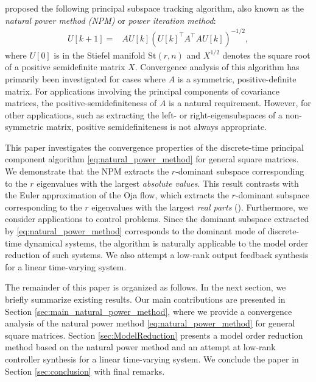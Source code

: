\documentclass{ifacconf}
\begin{document}
\cite{hua1999new} proposed the following principal subspace tracking algorithm, also known as the \textit{natural power method (NPM)} or \textit{power iteration method}:
\begin{align}
    U[k+1] =& A U[k] (U[k]^{\top} A^{\top} A U[k]) ^{-1/2}, 
    \label{eq:natural_power_method}
\end{align}
where $U[0]$ is in the Stiefel manifold $\mathrm{St}(r,n)$ and $X^{1/2}$ denotes the square root of a positive semidefinite matrix $X$. 
Convergence analysis of this algorithm has primarily been investigated for cases where $A$ is a symmetric, positive-definite matrix. 
For applications involving the principal components of covariance matrices, the positive-semidefiniteness of $A$ is a natural requirement.
However, for other applications, such as extracting the left- or right-eigensubspaces of a non-symmetric matrix, positive semidefiniteness is not always appropriate.

This paper investigates the convergence properties of the discrete-time principal component algorithm \eqref{eq:natural_power_method} for general square matrices. 
We demonstrate that the NPM extracts the $r$-dominant subspace corresponding to the $r$ eigenvalues with the largest \textit{absolute values}. 
This result contrasts with the Euler approximation of the Oja flow, which extracts the $r$-dominant subspace corresponding to the $r$ eigenvalues with the largest \textit{real parts} (\cite{kuo2025asymptotic,TsuzukiOhki2025global}). 
Furthermore, we consider applications to control problems. 
Since the dominant subspace extracted by \eqref{eq:natural_power_method} corresponds to the dominant mode of discrete-time dynamical systems, the algorithm is naturally applicable to the model order reduction of such systems. 
We also attempt a low-rank output feedback synthesis for a linear time-varying system. 

The remainder of this paper is organized as follows. 
In the next section, we briefly summarize existing results. 
Our main contributions are presented in Section \ref{sec:main_natural_power_method}, where we provide a convergence analysis of the natural power method \eqref{eq:natural_power_method} for general square matrices. 
Section \ref{sec:ModelReduction} presents a model order reduction method based on the natural power method and an attempt at low-rank controller synthesis for a linear time-varying system. 
We conclude the paper in Section \ref{sec:conclusion} with final remarks.
\end{document}
